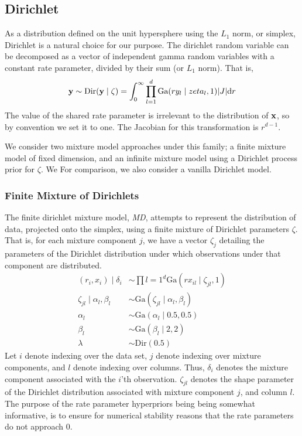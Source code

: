 \subsection{Dirichlet}
As a distribution defined on the unit hypersphere using the $L_1$ norm, or simplex, Dirichlet is a
  natural choice for our purpose.  The dirichlet random variable can be decomposed as a vector of
  independent gamma random variables with a constant rate parameter, divided by their sum
  (or $L_1$ norm). That is,
  \begin{equation}
    \label{eq:dirichletrv}
    {\bf y} \sim \text{Dir}({\bf y} \mid \zeta) =
        \int_0^{\infty}\prod_{l = 1}^d\text{Ga}(ry_l \mid zeta_l, 1)\lvert J\rvert\text{d}r
  \end{equation}
  The value of the shared rate parameter is irrelevant to the distribution of ${\bf x}$, so by
  convention we set it to one.  The Jacobian for this transformation is $r^{d-1}$.

We consider two mixture model approaches under this family; a finite mixture model of fixed
  dimension, and an infinite mixture model using a Dirichlet process prior for $\zeta$.
  We For comparison, we also consider a vanilla Dirichlet model.

\subsubsection{Finite Mixture of Dirichlets}
\label{model:md}
The finite dirichlet mixture model, \emph{MD}, attempts to represent the distribution of data, projected onto
  the simplex, using a finite mixture of Dirichlet parameters $\zeta$.  That is, for each mixture
  component $j$, we have a vector $\zeta_j$ detailing the parameters of the Dirichlet distribution
  under which observations under that component are distributed.
  \begin{equation}
    \label{eq:fmdirichlet}
    \begin{aligned}
      (r_i, x_i) \mid \delta_i &\sim \prod{l = 1}^d\text{Ga}(rx_{il}\mid \zeta_{jl}, 1)\\
            \zeta_{jl} \mid \alpha_l,\beta_l &\sim \text{Ga}(\zeta_{jl}\mid \alpha_l, \beta_l)\\
            \alpha_l &\sim \text{Ga}(\alpha_l \mid 0.5, 0.5)\\
            \beta_l &\sim \text{Ga}(\beta_l \mid 2, 2)\\
            \lambda &\sim \text{Dir}(0.5)
    \end{aligned}
  \end{equation}
  Let $i$ denote indexing over the data set, $j$ denote indexing over mixture components, and
  $l$ denote indexing over columns. Thus, $\delta_i$ denotes the mixture component associated
  with the $i$'th observation.  $\zeta_{jl}$ denotes the shape parameter of the Dirichlet
  distribution associated with mixture component $j$, and column $l$.  The purpose of the rate
  parameter hyperpriors being being somewhat informative, is to ensure for numerical stability
  reasons that the rate parameters do not approach 0.

